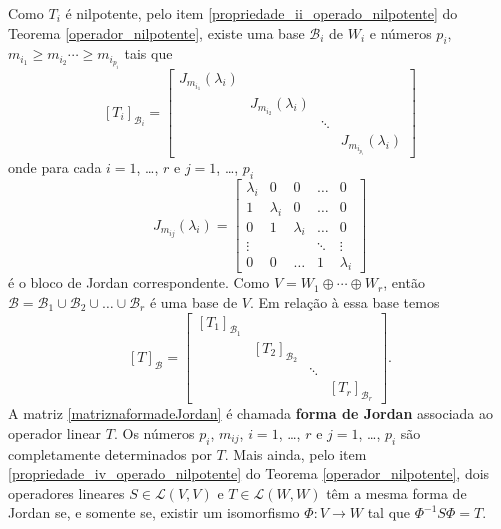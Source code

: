 Como $T_i$ \'e nilpotente, pelo item \ref{propriedade_ii_operado_nilpotente} do Teorema \ref{operador_nilpotente}, existe uma base $\mathcal{B}_i$ de $W_i$ e n\'umeros $p_i$, $m_{i_1} \ge m_{i_2} \cdots \ge m_{i_{p_i}}$ tais que
\[
	[T_i]_{\mathcal{B}_i} = \begin{bmatrix}
		J_{m_{i_1}}(\lambda_i)\\
		& J_{m_{i_2}}(\lambda_i)\\
		 & & \ddots\\
		& & & J_{m_{i_{p_i}}}(\lambda_i)
	\end{bmatrix}
\]
onde para cada $i = 1$, \dots, $r$ e $j = 1$, \dots, $p_i$
\[
	J_{m_{ij}}(\lambda_i) = \begin{bmatrix}
		\lambda_i & 0 & 0 & \dots & 0\\
		1 & \lambda_i & 0 & \dots & 0\\
		0 & 1 & \lambda_i & \dots & 0\\
		\vdots& & & \ddots & \vdots\\
		0 & 0 & \dots & 1 & \lambda_i
	\end{bmatrix}
\]
\'e o bloco de Jordan correspondente. Como $V = W_1 \oplus \cdots \oplus W_r$, ent\~ao $\mathcal{B} = \mathcal{B}_1 \cup \mathcal{B}_2 \cup \dots \cup \mathcal{B}_r$ \'e uma base de $V$. Em rela\c{c}\~ao \`a essa base temos
\begin{equation}\label{matriznaformadeJordan}
	[T]_\mathcal{B} = \begin{bmatrix}
		[T_1]_{\mathcal{B}_1}\\
		& [T_2]_{\mathcal{B}_2}\\
		& & \ddots\\
		& & & [T_r]_{\mathcal{B}_r}
	\end{bmatrix}.
\end{equation}
A matriz \eqref{matriznaformadeJordan} \'e chamada \textbf{forma de Jordan} associada ao operador linear $T$. Os n\'umeros $p_i$, $m_{ij}$, $i = 1$, \dots, $r$ e $j = 1$, \dots, $p_i$ s\~ao completamente determinados por $T$. Mais ainda, pelo item \ref{propriedade_iv_operado_nilpotente} do Teorema \ref{operador_nilpotente}, dois operadores lineares $S \in \mathcal{L}(V,V)$ e $T \in \mathcal{L}(W,W)$ t\^em a mesma forma de Jordan se, e somente se, existir um isomorfismo $\Phi : V \to W$ tal que $\Phi^{-1}S\Phi = T$.


